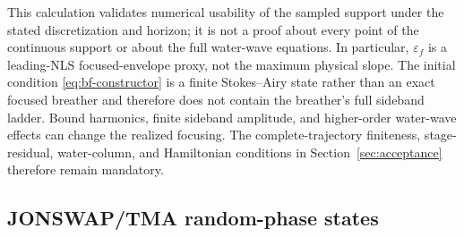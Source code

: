 \documentclass[11pt]{article}
\newcommand{\eps}{\varepsilon}
\begin{document}
This calculation validates numerical usability of the sampled support under
the stated discretization and horizon; it is not a proof about every point of
the continuous support or about the full water-wave equations.  In
particular, $\eps_f$ is a leading-NLS focused-envelope proxy, not the maximum
physical slope.  The initial condition \eqref{eq:bf-constructor} is a finite
Stokes--Airy state rather than an exact focused breather and therefore does
not contain the breather's full sideband ladder.  Bound harmonics, finite
sideband amplitude, and higher-order water-wave effects can change the
realized focusing.  The complete-trajectory finiteness, stage-residual,
water-column, and Hamiltonian conditions in Section~\ref{sec:acceptance}
therefore remain mandatory.

\subsection{JONSWAP/TMA random-phase states}
\label{sec:jonswap}
\end{document}
